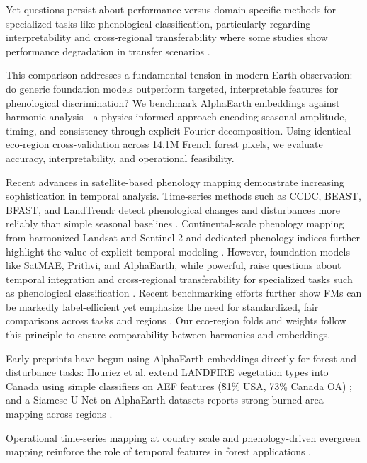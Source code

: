 \documentclass[utf8]{FrontiersinHarvard}
\begin{document}
Yet questions persist about performance versus domain-specific methods for specialized tasks like phenological classification, particularly regarding interpretability and cross-regional transferability where some studies show performance degradation in transfer scenarios \citep{Xie2024FoundationEffective}.

This comparison addresses a fundamental tension in modern Earth observation: do generic foundation models outperform targeted, interpretable features for phenological discrimination? We benchmark AlphaEarth embeddings against harmonic analysis—a physics-informed approach encoding seasonal amplitude, timing, and consistency through explicit Fourier decomposition. Using identical eco-region cross-validation across 14.1M French forest pixels, we evaluate accuracy, interpretability, and operational feasibility.


Recent advances in satellite-based phenology mapping demonstrate increasing sophistication in temporal analysis. Time-series methods such as CCDC, BEAST, BFAST, and LandTrendr detect phenological changes and disturbances more reliably than simple seasonal baselines \citep{Zhu2014,Zhao2019,Verbesselt2010a,Verbesselt2010b,Kennedy2010,Kennedy2018}. Continental-scale phenology mapping from harmonized Landsat and Sentinel-2 and dedicated phenology indices further highlight the value of explicit temporal modeling \citep{Bolton2020,Li2023,Low2020}. However, foundation models like SatMAE, Prithvi, and AlphaEarth, while powerful, raise questions about temporal integration and cross-regional transferability for specialized tasks such as phenological classification \citep{Cong2022,Szwarcman2024PrithviEO2,AlphaEarth2025,Xie2024FoundationEffective}. Recent benchmarking efforts further show FMs can be markedly label-efficient yet emphasize the need for standardized, fair comparisons across tasks and regions \citep{Dionelis2024BenchmarkFM}. Our eco-region folds and weights follow this principle to ensure comparability between harmonics and embeddings.

Early preprints have begun using AlphaEarth embeddings directly for forest and disturbance tasks: Houriez et al. extend LANDFIRE vegetation types into Canada using simple classifiers on AEF features (\~81\% USA, 73\% Canada OA) \citep{Houriez2025AEFDataGen}; and a Siamese U-Net on AlphaEarth datasets reports strong burned-area mapping across regions \citep[][note: dataset branding vs 64D feature use varies]{Seydi2025AlphaEarthBurnedArea}.

Operational time-series mapping at country scale and phenology-driven evergreen mapping reinforce the role of temporal features in forest applications \citep{Inglada2017,Li2023,Low2020,Bolton2020}.
\end{document}
